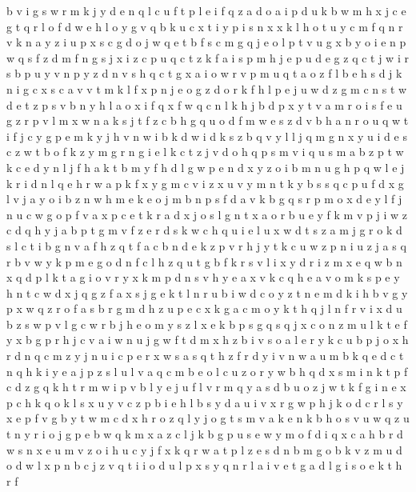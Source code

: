 \documentclass{article}
\begin{document}
b v i g s w r m k j y d e n q l c u f t p
l e i f q z a d o
a i p d u k b w m h x j c e g t q r l o f
d w e h l o y g v q b k u c x t i
y p i s n x
x k l h o t u y c m f q n
r v k n a y z i u p x s c g d o j w q e t b f
s c m g q j e o l p t v
u g x b y o i e n p w q s f z d m
f n g s j x i z c p u
q c t z k f a i s p m h j e
p u d e
g z q c t j w i r s b p u y v n
p y z d n v s h q c t g x a i o w r
v p m u q t a o z f l b e h s d j k n i g c x
s c a v
v t m k l f x p n j e o g z d
o r k f h l p e j u w d z g m c n s t
w d e t z p s v b n y h l a o x i f q
x f
w q c n l k h j b d p x y t v a m r o i s f e u g z
r p v l m x w n a k s j t f z c b h g q u o
d f m w e
s z d v b h a n r o u q w t i f j c y g p e m k
y j h v n
w i b k d
w i d k s z b q v y l
l j q m g n x y u i d e s c z w t b o f k
z y m g
r n g i e l k c t z j v d o h q p s m
v i q u s m a b z p t w k c e d y n l j f h
a k t b m y f h d l g w p e n
d x y z o i b m n u g h p q w l e j k
r
i d n l q e h r w a p k f x y g m c v
i z x u v y m
n t k y b s
s q c p u f d x g l v j a y o i b z n w h m e
k e o j m b n p s f d
a v k b g q s r p m o x d e y l f j n u c w
g o p f v
a x p c e t k r
a d x j o
s l g n t x a o r b u e y f k m v p j i w z c d q h
y j a b p t g m v f z e r d s k w c h q u i
e l u x w d t s z a m j g r
o k d s l c t i b g n v a f h z q
t f a c b n d e k z p v
r h j y t k c u w z p n
i u z j a s q r b v w y k p m e g o d n f c l
h z q u t g b f k r s v l i x y d
r i z m x e q
w b n x q d p l k t a g i o v r y
x k m p d n s v h y e a
x v k c q h e
a v o m k s p e y h n t c w d x j q g z f
a x s j g e k t l n r u b i w d c o y z
t n e m d k i h b v g y p x w q z r o f a s
b r g m d h z u p e c x k
g a c m o y k t h q j l n f r v i x d u b z s w p
v l g c w r b j h e o m y s z
l x e k b p s g q
s q j x c
o n z m u l k t e f y x b g p r h j c v a i w
n u j g w f t d m x h z b i v s o a l e r y k c
u b p j o x h r d n q c m z y
j n u i c p e
r x w s a
s q t h z f r d y i v n w a u m b k
q e
d c t n q h k i y e a j p z s l
u l v
a q c m b e o
l c u z o r y w b h q d x s m i n k t p f
c d z g q k h t r m w i p v b l y e j u f
l v r m q y a s d b u o z j w t k f g i n e x p c h
k
q o k l s x u y v c z p b i e h
l b s y d a u i v x r g w p h j k o
d c r l s y x e
p f v g b y t w m c d x h r o
z q l y j o g t s
m
v a k e
n k b h o s v u w q
z u t n y r i o j g p e b w q k m x a
z c l j k b g p u s e w y m o f d i q x
c a h b r d w s n x e u m v z
o i h u c y j f x k q r w a t p l z e s d n b m g
o b k v z m u d
o d w l x p n b c j z v q t i
i o d u l
p x s y q n r l a i v e t g
a d l g i s o e k t h r f
\end{document}
